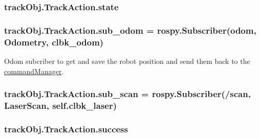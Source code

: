 \subsubsection[{\texorpdfstring{state}{state}}]{\setlength{\rightskip}{0pt plus 5cm}track\+Obj.\+Track\+Action.\+state\hspace{0.3cm}{\ttfamily [static]}}\hypertarget{classtrackObj_1_1TrackAction_a6462afc7fd3bfdfe50bcafe449e1039a}{}\label{classtrackObj_1_1TrackAction_a6462afc7fd3bfdfe50bcafe449e1039a}
\subsubsection[{\texorpdfstring{sub\+\_\+odom}{sub_odom}}]{\setlength{\rightskip}{0pt plus 5cm}track\+Obj.\+Track\+Action.\+sub\+\_\+odom = rospy.\+Subscriber(\textquotesingle{}odom\textquotesingle{}, Odometry, {\bf clbk\+\_\+odom})\hspace{0.3cm}{\ttfamily [static]}}\hypertarget{classtrackObj_1_1TrackAction_ab3c7dde48dee75ff2334f0b834c1bbff}{}\label{classtrackObj_1_1TrackAction_ab3c7dde48dee75ff2334f0b834c1bbff}


Odom subcriber to get and save the robot position and send them back to the \hyperlink{namespacecommandManager}{command\+Manager}. 

\subsubsection[{\texorpdfstring{sub\+\_\+scan}{sub_scan}}]{\setlength{\rightskip}{0pt plus 5cm}track\+Obj.\+Track\+Action.\+sub\+\_\+scan = rospy.\+Subscriber(\textquotesingle{}/scan\textquotesingle{}, Laser\+Scan, self.\+clbk\+\_\+laser)\hspace{0.3cm}{\ttfamily [static]}}\hypertarget{classtrackObj_1_1TrackAction_ac76d0b7d602402756b8dd186a89962de}{}\label{classtrackObj_1_1TrackAction_ac76d0b7d602402756b8dd186a89962de}
\subsubsection[{\texorpdfstring{success}{success}}]{\setlength{\rightskip}{0pt plus 5cm}track\+Obj.\+Track\+Action.\+success\hspace{0.3cm}{\ttfamily [static]}}\hypertarget{classtrackObj_1_1TrackAction_a9e4285f36d3025a6c23aea961daf6235}{}\label{classtrackObj_1_1TrackAction_a9e4285f36d3025a6c23aea961daf6235}


